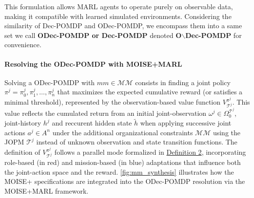 \documentclass[pdflatex,sn-mathphys-num]{sn-jnl}%
\theoremstyle{thmstyleone}%
\theoremstyle{thmstyletwo}%
\theoremstyle{thmstylethree}%
\begin{document}
\noindent This formulation allows MARL agents to operate purely on observable data, making it compatible with learned simulated environments. Considering the similarity of Dec-POMDP and ODec-POMDP, we encompass them into a same set we call \textbf{ODec-POMDP or Dec-POMDP} denoted \textbf{O$\backslash$Dec-POMDP} for convenience.

\paragraph{\textbf{Resolving the ODec-POMDP with MOISE+MARL}}

Solving a ODec-POMDP with $mm \in \mathcal{MM}$ consists in finding a joint policy $\pi^j = {\pi^j_0, \pi^j_1, \dots, \pi^j_n}$ that maximizes the expected cumulative reward (or satisfies a minimal threshold), represented by the observation-based value function $V_{\mathcal{T}^j}^{\pi^j}$. This value reflects the cumulated return from an initial joint-observation $\omega^j \in \Omega^{\mathcal{T}^j}_0$, joint-history $h^j$ and reccurent hidden state $\tilde{h}$ when applying successive joint actions $a^j \in A^n$ under the additional organizational constraints $\mathcal{MM}$ using the JOPM $\mathcal{T}^j$ instead of unknown observation and state transition functions.
%
The definition of $V_{\mathcal{T}^j}^{\pi^j}$ follows a parallel mode formalized in \hyperref[eq:single_value_function]{Definition 2}, incorporating role-based (in red) and mission-based (in blue) adaptations that influence both the joint-action space and the reward.
\autoref{fig:mm_synthesis} illustrates how the MOISE+ specifications are integrated into the ODec-POMDP resolution via the MOISE+MARL framework.
\end{document}
